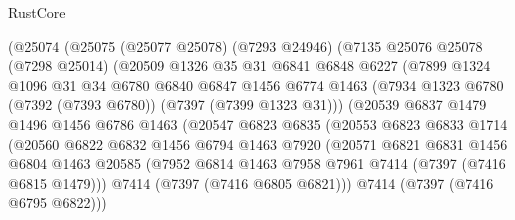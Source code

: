 \begin{lexlean}{RustCore}
\begin{coremodule}
                  (@25074
                    (@25075
                      (@25077 @25078)
                      (@7293 @24946)
                      (@7135
                        @25076
                        @25078
                        (@7298 @25014)
                        (@20509
                          @1326
                          @35
                          @31
                          @6841
                          @6848
                          @6227
                          (@7899
                            @1324
                            @1096
                            @31
                            @34
                            @6780
                            @6840
                            @6847
                            @1456
                            @6774
                            @1463
                            (@7934 @1323 @6780 (@7392 (@7393 @6780)) (@7397 (@7399 @1323 @31)))
                            (@20539
                              @6837
                              @1479
                              @1496
                              @1456
                              @6786
                              @1463
                              (@20547
                                @6823
                                @6835
                                (@20553
                                  @6823
                                  @6833
                                  @1714
                                  (@20560
                                    @6822
                                    @6832
                                    @1456
                                    @6794
                                    @1463
                                    @7920
                                    (@20571
                                      @6821
                                      @6831
                                      @1456
                                      @6804
                                      @1463
                                      @20585
                                      (@7952
                                        @6814
                                        @1463
                                        @7958
                                        @7961
                                        @7414
                                        (@7397 (@7416 @6815 @1479)))
                                      @7414
                                      (@7397 (@7416 @6805 @6821)))
                                    @7414
                                    (@7397 (@7416 @6795 @6822)))

\end{coremodule}
\end{lexlean}
